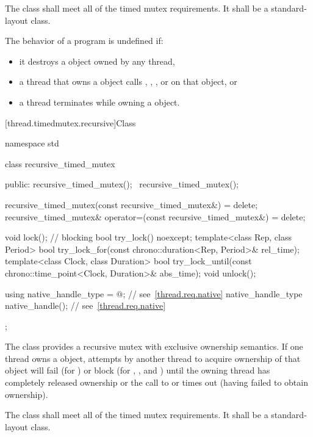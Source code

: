\pnum
The class  shall meet all of the timed mutex
requirements. It shall be a standard-layout
class.

\pnum
The behavior of a program is undefined if:
\begin{itemize}
\item it destroys a  object owned by any thread,
\item a thread that owns a  object calls ,
, , or  on that object, or
\item a thread terminates while owning a  object.
\end{itemize}

[thread.timedmutex.recursive]{Class }

%
\begin{codeblock}
namespace std {
  class recursive_timed_mutex {
  public:
    recursive_timed_mutex();
    ~recursive_timed_mutex();

    recursive_timed_mutex(const recursive_timed_mutex&) = delete;
    recursive_timed_mutex& operator=(const recursive_timed_mutex&) = delete;

    void lock();    // blocking
    bool try_lock() noexcept;
    template<class Rep, class Period>
      bool try_lock_for(const chrono::duration<Rep, Period>& rel_time);
    template<class Clock, class Duration>
      bool try_lock_until(const chrono::time_point<Clock, Duration>& abs_time);
    void unlock();

    using native_handle_type = @\impdefnc@;          // see~\ref{thread.req.native}
    native_handle_type native_handle();                         // see~\ref{thread.req.native}
  };
}
\end{codeblock}

\pnum
The class  provides a recursive mutex with exclusive
ownership semantics. If one thread owns a  object,
attempts by another thread to acquire ownership of that object will fail (for
) or block (for , , and
) until the owning thread has completely released
ownership or the call to  or 
times out (having failed to obtain ownership).

\pnum
The class  shall meet all of the timed mutex
requirements. It shall be a standard-layout
class.


